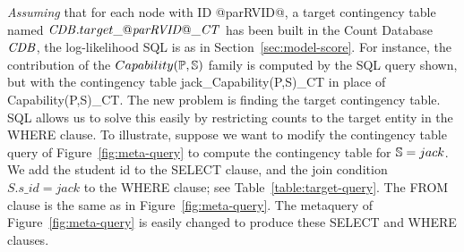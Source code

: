 \documentclass{IEEEtran}
\begin{document}
{\em Assuming} that for each node with ID @parRVID@, a target contingency table named $\CDB.target\_@\it{parRVID}@\_\cttable$ has been built in the Count Database $\CDB$, the log-likelihood SQL is as in Section~\ref{sec:model-score}. For instance, the contribution of the $Capability(\P,\S)$ family is computed by the SQL query shown,  but with the contingency table jack\_Capability(P,S)\_CT in place of Capability(P,S)\_CT.
%
The new problem is finding the target contingency table. SQL allows us to solve this easily by restricting counts to the target entity in the WHERE clause. To illustrate, suppose we want to modify the contingency table query of Figure~\ref{fig:meta-query} to compute the contingency table for $\S = jack$. We add the student id to the SELECT clause, and the join condition $S.s\_id = jack$ to the WHERE clause; see Table~\ref{table:target-query}.%
The FROM clause is the same as in Figure~\ref{fig:meta-query}. The metaquery of Figure~\ref{fig:meta-query} is easily changed to produce these SELECT and WHERE clauses.


%
%
%
\end{document}
